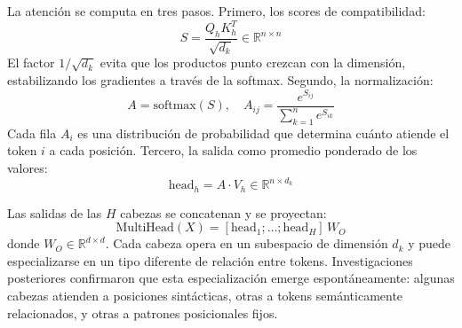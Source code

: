 La atención se computa en tres pasos. Primero, los scores de compatibilidad:
\begin{equation}
    S = \frac{Q_h K_h^T}{\sqrt{d_k}} \in \mathbb{R}^{n \times n}
    \label{eq:scores}
\end{equation}
El factor $1/\sqrt{d_k}$ evita que los productos punto crezcan con la dimensión,
estabilizando los gradientes a través de la softmax. Segundo, la normalización:
\begin{equation}
    A = \text{softmax}(S), \quad A_{ij} = \frac{e^{S_{ij}}}{\sum_{k=1}^{n} e^{S_{ik}}}
    \label{eq:softmax-attn}
\end{equation}
Cada fila $A_i$ es una distribución de probabilidad que determina cuánto atiende
el token $i$ a cada posición. Tercero, la salida como promedio ponderado de los
valores:
\begin{equation}
    \text{head}_h = A \cdot V_h \in \mathbb{R}^{n \times d_k}
    \label{eq:head-output}
\end{equation}

Las salidas de las $H$ cabezas se concatenan y se proyectan:
\begin{equation}
    \text{MultiHead}(X) = [\text{head}_1; \ldots; \text{head}_H]\, W_O
    \label{eq:multihead}
\end{equation}
donde $W_O \in \mathbb{R}^{d \times d}$. Cada cabeza opera en un subespacio de
dimensión $d_k$ y puede especializarse en un tipo diferente de relación entre
tokens. Investigaciones posteriores \cite{voita2019analyzing, clark2019what}
confirmaron que esta especialización emerge espontáneamente: algunas cabezas
atienden a posiciones sintácticas, otras a tokens semánticamente relacionados, y
otras a patrones posicionales fijos.

